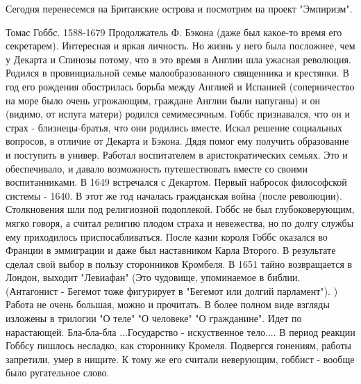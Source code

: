 Сегодня перенесемся на Британские острова и посмотрим на проект "Эмпиризм".

Томас Гоббс. 1588-1679
Продолжатель Ф. Бэкона (даже был какое-то время его секретарем). Интересная и яркая личность. Но жизнь у него была посложнее, чем у Декарта и Спинозы потому, что в это время в Англии шла ужасная революция.
Родился в провинциальной семье малообразованного священника и крестянки. В год его рождения обострилась борьба между Англией и Испанией (соперничество на море было очень угрожающим, граждане Англии были напуганы) и он (видимо, от испуга матери) родился семимесячным. Гоббс признавался, что он и страх - близнецы-братья, что они родились вместе. Искал решение социальных вопросов, в отличие от Декарта и Бэкона. Дядя помог ему получить образование и поступить в универ. Работал воспитателем в аристократических семьях. Это и обеспечивало, и давало возможность путешествовать вместе со своими воспитанниками. В 1649 встречался с Декартом. Первый набросок философской системы - 1640. В этот же год началась гражданская война (после революции). Столкновения шли под религиозной подоплекой. Гоббс не был глубоковерующим, мягко говоря, а считал религию плодом страха и невежества, но по долгу службы ему приходилось приспосабливаться. После казни короля Гоббс оказался во Франции в эммиграции и даже был наставником Карла Второго. В результате сделал свой выбор в пользу сторонников Кромбеля. 
В 1651 тайно возвращается в Лондон, выходит "Левиафан" (Это чудовище, упоминаемое в библии. (Антагонист - Бегемот тоже фигурирует в "Бегемот или долгий парламент"). ) Работа не очень большая, можно и прочитать. 
В более полном виде взгляды изложены в трилогии "О теле" "О человеке" "О гражданине". Идет по нарастающей. Бла-бла-бла ...Государство - искуственное тело....
В период реакции Гоббсу пишлось несладко, как стороннику Кромеля. Подвергся гонениям, работы запретили, умер в нищите. К тому же его считали неверующим, гоббист - вообще было ругательное слово.

